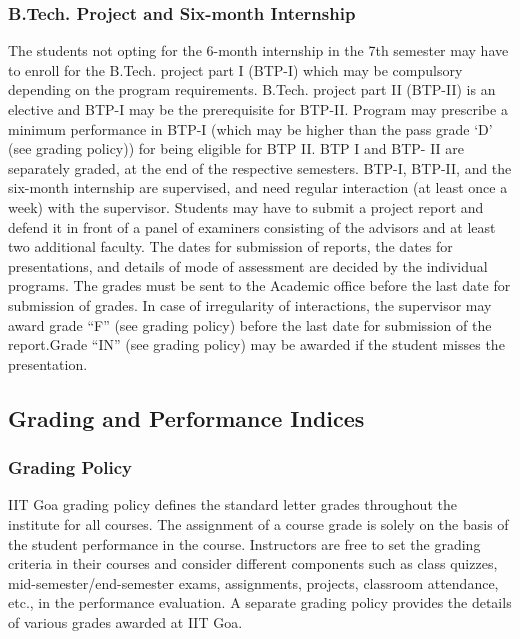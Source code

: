 \subsubsection{B.Tech. Project and Six-month Internship}

The students not opting for the 6-month internship in the 7th semester may have to enroll for the B.Tech. project part I (BTP-I) which may be compulsory depending on the program requirements. B.Tech. project part II (BTP-II) is an elective and BTP-I may be the prerequisite for BTP-II. Program may prescribe a minimum performance in BTP-I (which may be higher than the pass grade ‘D’ (see grading policy)) for being eligible for BTP II. BTP I and BTP- II are separately graded, at the end of the respective semesters. 
BTP-I, BTP-II, and the six-month internship are supervised, and need regular interaction (at least once a week) with the supervisor. Students may have to submit a project report and defend it in front of a panel of examiners consisting of the advisors and at least two additional faculty. The dates for submission of reports, the dates for presentations, and details of mode of assessment are decided by the individual programs. The grades must be sent to the Academic office before the last date for submission of grades. In case of irregularity of interactions, the supervisor may award grade “F” (see grading policy) before the last date for submission of the report.Grade “IN” (see grading policy) may be awarded if the student misses the presentation.

\subsection{Grading and Performance Indices}

\subsubsection{Grading Policy}

IIT Goa grading policy defines the standard letter grades throughout the institute for all courses. The assignment of a course grade is solely on the basis of the student performance in the course. Instructors are free to set the grading criteria in their courses and consider different components such as class quizzes, mid-semester/end-semester exams, assignments, projects, classroom attendance, etc., in the performance evaluation.  A separate grading policy provides the details of various grades awarded at IIT Goa.


